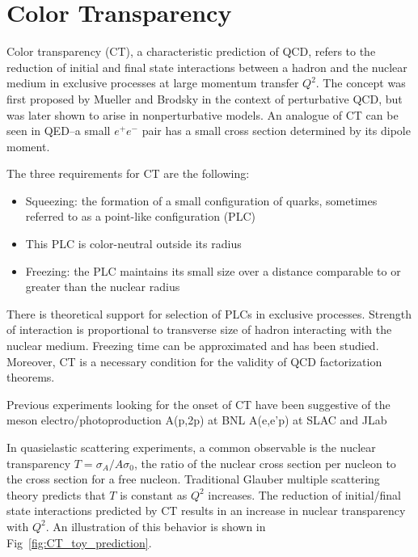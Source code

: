 \section{Color Transparency}
Color transparency (CT), a characteristic prediction of QCD, refers to the
reduction of initial and final state interactions between a hadron and the
nuclear medium in exclusive processes at large momentum transfer $Q^2$.
The concept was first proposed by Mueller and Brodsky in the context of
perturbative QCD, but was later shown to arise in nonperturbative models.
An analogue of CT can be seen in QED--a small $e^+e^-$ pair has a small cross
section determined by its dipole moment.


The three requirements for CT are the following:
\begin{itemize}
    \item Squeezing: the formation of a small configuration of quarks, sometimes
          referred to as a point-like configuration (PLC)
    \item This PLC is color-neutral outside its radius
    \item Freezing: the PLC maintains its small size over a distance comparable
          to or greater than the nuclear radius
\end{itemize}
There is theoretical support for selection of PLCs in exclusive processes.
Strength of interaction is proportional to transverse size of hadron interacting
with the nuclear medium.
Freezing time can be approximated and has been studied.
Moreover, CT is a necessary condition for the validity of QCD factorization
theorems.


Previous experiments looking for the onset of CT have been suggestive of the
meson electro/photoproduction
A(p,2p) at BNL
A(e,e'p) at SLAC and JLab


In quasielastic scattering experiments, a common observable is the nuclear
transparency $T=\sigma_A/A\sigma_0$, the ratio of the nuclear cross section per
nucleon to the cross section for a free nucleon.
Traditional Glauber multiple scattering theory predicts that $T$ is constant as
$Q^2$ increases.
The reduction of initial/final state interactions predicted by CT results in an
increase in nuclear transparency with $Q^2$.
An illustration of this behavior is shown in Fig~\ref{fig:CT_toy_prediction}.

